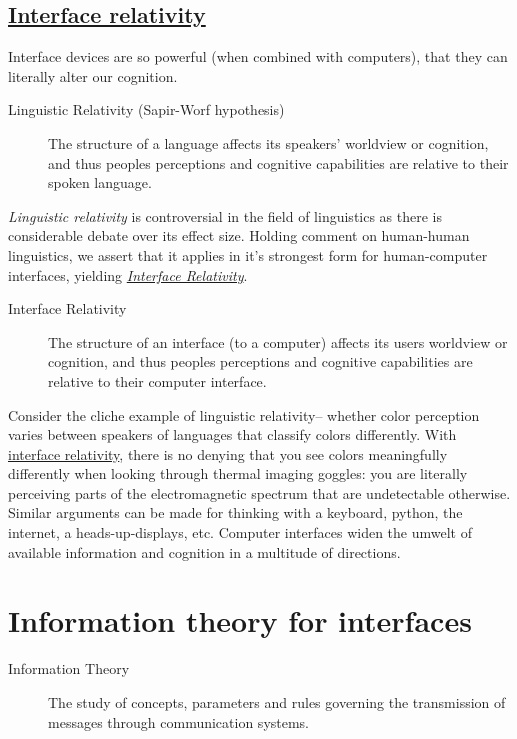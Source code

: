 \documentclass[logo,bsc,singlespacing,parskip]{infthesis}
\begin{document}
\subsection{\hyperref[org6de6ca9]{Interface relativity}}
\label{sec:org087237e}
Interface devices are so powerful (when combined with computers), that they can literally alter our cognition.

\begin{mdframed}
\begin{description}
\item[{Linguistic Relativity (Sapir-Worf hypothesis)}] The structure of a language affects its speakers' worldview or cognition, and thus peoples perceptions and cognitive capabilities are relative to their spoken language.
\end{description}
\end{mdframed}

\emph{Linguistic relativity} is controversial in the field of linguistics as there is considerable debate over its effect size.
Holding comment on human-human linguistics, we assert that it applies in it's strongest form for human-computer interfaces, yielding \emph{\hyperref[org6de6ca9]{Interface Relativity}}.

\begin{mdframed}
\begin{description}
\item[{\label{org6de6ca9}Interface Relativity}] The structure of an interface (to a computer) affects its users worldview or cognition, and thus peoples perceptions and cognitive capabilities are relative to their computer interface.
\end{description}
\end{mdframed}

Consider the cliche example of linguistic relativity-- whether color perception varies between speakers of languages that classify colors differently.
With \hyperref[org6de6ca9]{interface relativity}, there is no denying that you see colors meaningfully differently when looking through thermal imaging goggles: you are literally perceiving parts of the electromagnetic spectrum that are undetectable otherwise.
Similar arguments can be made for thinking with a keyboard, python, the internet, a heads-up-displays, etc.
Computer interfaces widen the umwelt of available information and cognition in a multitude of directions.

\section{Information theory for interfaces}
\label{sec:org17d2442}
\begin{mdframed}
\begin{description}
\item[{Information Theory\label{information theory}}] The study of concepts, parameters and rules governing the transmission of messages through communication systems.
\end{description}
\end{mdframed}
\end{document}
